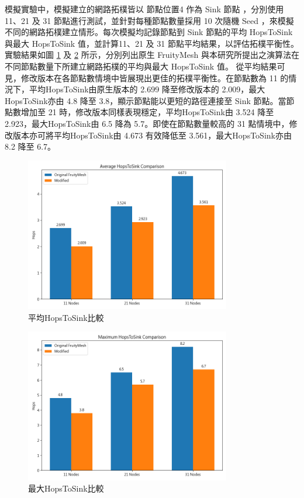 \begin{ZhChapter}
模擬實驗中，模擬建立的網路拓樸皆以 節點位置4 作為 Sink 節點 ，分別使用 11、21 及 31 節點進行測試，並針對每種節點數量採用 10 次隨機 Seed ，來模擬不同的網路拓樸建立情形。每次模擬均記錄節點到 Sink 節點的平均 HopsToSink 與最大 HopsToSink 值，並計算11、21 及 31 節點平均結果，以評估拓樸平衡性。
實驗結果如圖 \ref{fig: Avg_hops_comparison} 及 \ref{fig: Max_hops_comparison} 所示，分別列出原生 FruityMesh 與本研究所提出之演算法在不同節點數量下所建立網路拓樸的平均與最大 HopsToSink 值。
從平均結果可見，修改版本在各節點數情境中皆展現出更佳的拓樸平衡性。在節點數為 11 的情況下，平均HopsToSink由原生版本的 2.699 降至修改版本的 2.009，最大HopsToSink亦由 4.8 降至 3.8，顯示節點能以更短的路徑連接至 Sink 節點。當節點數增加至 21 時，修改版本同樣表現穩定，平均HopsToSink由 3.524 降至 2.923，最大HopsToSink由 6.5 降為 5.7。即使在節點數量較高的 31 點情境中，修改版本亦可將平均HopsToSink由 4.673 有效降低至 3.561，最大HopsToSink亦由 8.2 降至 6.7。

\begin{figure}[H]
    \centering
    \includegraphics[width = 0.8\textwidth]{image/Avg_hops_comparison.png}
    \caption{平均HopsToSink比較}
    \label{fig: Avg_hops_comparison}
\end{figure}

\begin{figure}[H]
    \centering
    \includegraphics[width = 0.8\textwidth]{image/Max_hops_comparison.png}
    \caption{最大HopsToSink比較}
    \label{fig: Max_hops_comparison}
\end{figure}


\end{ZhChapter}
